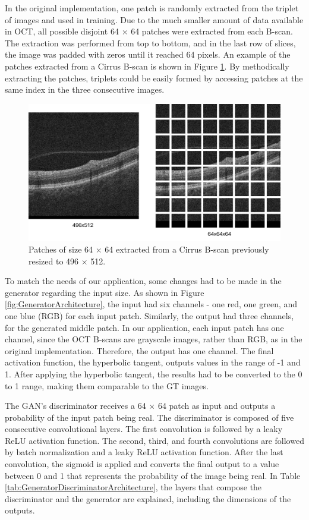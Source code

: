 In the original implementation, one patch is randomly extracted from the triplet of images and used in training. Due to the much smaller amount of data available in OCT, all possible disjoint 64 $\times$ 64 patches were extracted from each B-scan. The extraction was performed from top to bottom, and in the last row of slices, the image was padded with zeros until it reached 64 pixels. An example of the patches extracted from a Cirrus B-scan is shown in Figure \ref{fig:CirrusSixtyFourPatchExtraction}. By methodically extracting the patches, triplets could be easily formed by accessing patches at the same index in the three consecutive images.

\begin{figure}[!ht]
	\centering
	\includegraphics[width=0.7\linewidth]{figures/CirrusSixtyFourPatchExtraction.png}
	\caption{Patches of size 64 $\times$ 64 extracted from a Cirrus B-scan previously resized to 496 $\times$ 512.}
	\label{fig:CirrusSixtyFourPatchExtraction}
\end{figure}

To match the needs of our application, some changes had to be made in the generator regarding the input size. As shown in Figure \ref{fig:GeneratorArchitecture}, the input had six channels - one red, one green, and one blue (RGB) for each input patch. Similarly, the output had three channels, for the generated middle patch. In our application, each input patch has one channel, since the OCT B-scans are grayscale images, rather than RGB, as in the original implementation. Therefore, the output has one channel. The final activation function, the hyperbolic tangent, outputs values in the range of -1 and 1. After applying the hyperbolic tangent, the results had to be converted to the 0 to 1 range, making them comparable to the GT images.
\par
The GAN's discriminator receives a 64 $\times$ 64 patch as input and outputs a probability of the input patch being real. The discriminator is composed of five consecutive convolutional layers. The first convolution is followed by a leaky ReLU activation function. The second, third, and fourth convolutions are followed by batch normalization and a leaky ReLU activation function. After the last convolution, the sigmoid is applied and converts the final output to a value between 0 and 1 that represents the probability of the image being real. In Table \ref{tab:GeneratorDiscriminatorArchitecture}, the layers that compose the discriminator and the generator are explained, including the dimensions of the outputs.

